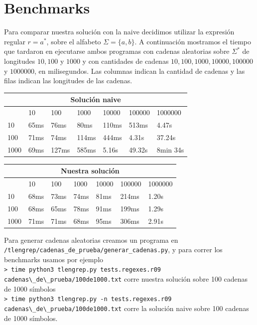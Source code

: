 \section{Benchmarks}
Para comparar nuestra solución con la naive decidimos utilizar la expresión regular $r = a^*$, sobre el alfabeto $\Sigma = \{a, b\}$. A continuación mostramos el
tiempo que tardaron en ejecutarse ambos programas con cadenas aleatorias sobre $\Sigma^*$ de longitudes $10, 100$ y $1000$ y con cantidades de cadenas $10, 100, 1000, 10000, 100000$ y $1000000$,
en milisegundos. Las columnas indican la cantidad de cadenas y las filas indican las longitudes de las cadenas.

\begin{center}
\begin{tabular}{|l|l|l|l|l|l|l|}
\multicolumn{7}{c}{Solución naive} \\ \hline
     & 10 & 100 & 1000 & 10000 & 100000 & 1000000 \\ \hline
10   & 65ms & 76ms & 80ms & 110ms & 513ms & 4.47s \\
100  & 71ms & 74ms & 114ms & 444ms & 4.31s & 37.24s \\
1000 & 69ms & 127ms & 585ms & 5.16s & 49.32s & 8min 34s \\ \hline
\end{tabular}
\end{center}

\begin{center}
\begin{tabular}{|l|l|l|l|l|l|l|}
\multicolumn{7}{c}{Nuestra solución} \\ \hline
     & 10 & 100 & 1000 & 10000 & 100000 & 1000000 \\ \hline
10   & 68ms & 73ms  & 74ms & 81ms & 214ms & 1.20s \\
100  & 68ms & 65ms & 78ms & 91ms & 199ms & 1.29s \\
1000 & 71ms & 71ms & 68ms & 95ms & 306ms & 2.91s \\\hline
\end{tabular}
\end{center}

Para generar cadenas aleatorias creamos un programa en \texttt{/tlengrep/cadenas\_de\_prueba/generar\_cadenas.py}, y para correr los benchmarks usamos
por ejemplo \\ \verb|> time python3 tlengrep.py tests.regexes.r09 cadenas\_de\_prueba/100de1000.txt| corre nuestra solución sobre 100 cadenas de 1000 símbolos
\\\verb|> time python3 tlengrep.py -n tests.regexes.r09 cadenas\_de\_prueba/100de1000.txt| corre la solución naive sobre 100 cadenas de 1000 símbolos.

